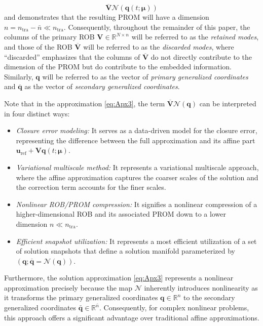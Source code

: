 \documentclass[preprint,10pt]{elsarticle}
\begin{document}
\begin{itemize}
\begin{equation}
			\overline{\mathbf{V}}\mathcal{N}(\mathbf{q}(t; \boldsymbol{\mu})) 
			\label{eq:Apx3} 
		\end{equation}
        and demonstrates that the resulting PROM will have a dimension $n = n_\text{tra} - \bar n \ll n_\text{tra}$. Consequently, 
	throughout the remainder of this paper, the columns of the primary ROB $\mathbf V \in \mathbb{R}^{N\times n}$ will be referred
	to as the \textit{retained modes}, and those of the ROB $\overline{\mathbf{V}}$ will be referred to as the \textit{discarded 
	modes}, where ``discarded'' emphasizes that the columns of $\overline{\mathbf{V}}$ do not directly contribute to the dimension
	of the PROM but do contribute to the embedded information. Similarly, $\mathbf q$ will be referred to as the vector of 
	\textit{primary generalized coordinates} and $\overline{\mathbf{q}}$ as the vector of \textit{secondary generalized 
	coordinates}.
\end{itemize}

Note that in the approximation \eqref{eq:Apx3}, the term $\overline{\mathbf{V}}\mathcal{N}(\mathbf{q})$ can be interpreted in four distinct ways:
\begin{itemize}
    \item \textit{Closure error modeling:} It serves as a data-driven model for the closure error, representing the difference between the full approximation and its affine part
	    $\mathbf{u}_\text{ref} + \mathbf{V} \mathbf{q}(t; \boldsymbol{\mu})$.
    \item \textit{Variational multiscale method:} It represents a variational multiscale approach, where the affine approximation captures the coarser scales of the solution and the correction term accounts for the finer scales.
    \item \textit{Nonlinear ROB/PROM compression:} It signifies a nonlinear compression of a higher-dimensional ROB and its associated PROM down to a lower dimension $n \ll n_\text{tra}$.
    \item \textit{Efficient snapshot utilization:} It represents a most efficient utilization of a set of solution snapshots that define a solution manifold parameterized by $(\mathbf{q}; \overline{\mathbf{q}} = \mathcal{N}(\mathbf{q}))$.
\end{itemize}

Furthermore, the solution approximation \eqref{eq:Apx3} represents a nonlinear approximation precisely because the map $\mathcal{N}$ inherently introduces nonlinearity as it 
transforms the primary generalized coordinates $\mathbf{q} \in \mathbb{R}^n$ to the secondary generalized coordinates ${\bar{\mathbf q}} \in \mathbb{R}^{\bar{n}}$. Consequently, 
for complex nonlinear problems, this approach offers a significant advantage over traditional affine approximations.
\end{document}
